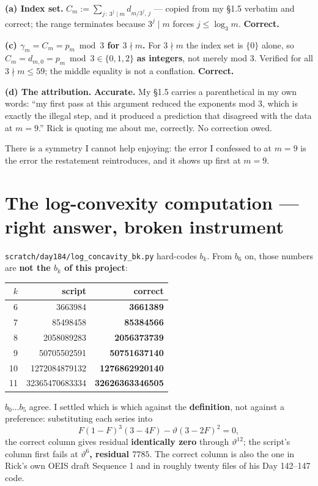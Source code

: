 \documentclass[11pt]{article}
\newcommand{\code}[1]{\texttt{#1}}
\begin{document}
\textbf{(a) Index set.} $C_m := \sum_{j\,:\,3^j\mid m} d_{m/3^j,\,j}$ --- copied from my
\S1.5 verbatim and correct; the range terminates because $3^j\mid m$ forces
$j\le \log_3 m$. \textbf{Correct.}

\textbf{(c) $\gamma_m = C_m = p_m \bmod 3$ for $3\nmid m$.} For $3\nmid m$ the index set
is $\{0\}$ alone, so $C_m = d_{m,0} = p_m \bmod 3 \in\{0,1,2\}$ \textbf{as integers}, not
merely mod 3. Verified for all $3\nmid m\le 59$; the middle equality is not a conflation.
\textbf{Correct.}

\textbf{(d) The attribution.} \textbf{Accurate.} My \S1.5 carries a parenthetical in my
own words: ``my first pass at this argument reduced the exponents mod 3, which is exactly
the illegal step, and it produced a prediction that disagreed with the data at $m=9$.''
Rick is quoting me about me, correctly. No correction owed.

There is a symmetry I cannot help enjoying: the error I confessed to at $m=9$ is the error
the restatement reintroduces, and it shows up first at $m=9$.

\section{The log-convexity computation --- right answer, broken instrument}

\code{scratch/day184/log\_concavity\_bk.py} hard-codes $b_k$. From $b_6$ on, those numbers
are \textbf{not the $b_k$ of this project}:

\begin{center}
\begin{tabular}{rrr}
\toprule
$k$ & script & correct \\
\midrule
6  & 3663984 & \textbf{3661389} \\
7  & 85498458 & \textbf{85384566} \\
8  & 2058089283 & \textbf{2056373739} \\
9  & 50705502591 & \textbf{50751637140} \\
10 & 1272084879132 & \textbf{1276862920140} \\
11 & 32365470683334 & \textbf{32626363346505} \\
\bottomrule
\end{tabular}
\end{center}

$b_0\ldots b_5$ agree. I settled which is which against the \textbf{definition}, not
against a preference: substituting each series into
\[
  F(1-F)^3(3-4F) - \vartheta(3-2F)^2 = 0,
\]
the correct column gives residual \textbf{identically zero} through $\vartheta^{12}$; the
script's column first fails at \textbf{$\vartheta^{6}$, residual $7785$}. The correct
column is also the one in Rick's own OEIS draft Sequence 1 and in roughly twenty files of
his Day 142--147 code.
\end{document}
